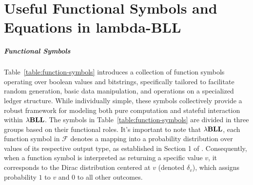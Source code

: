 \renewcommand{\chaptermark}[1]{\markright{\thechapter \ #1}{}}
\lhead[\fancyplain{}{\bfseries\thepage}]{\fancyplain{}{\bfseries\rightmark}}
\appendix
\chapter{Useful Functional Symbols and Equations in lambda-BLL}\label{app:1}
\paragraph{Functional Symbols}
Table~\ref{table:function-symbols} introduces a collection of function symbols operating over boolean values and bitstrings, specifically tailored to facilitate random generation, basic data manipulation, and operations on a specialized ledger structure. While individually simple, these symbols collectively provide a robust framework for modeling both pure computation and stateful interaction within ${\lambda}\mathbf{BLL}$. The symbols in Table~\ref{table:function-symbols} are divided in three groups based on their functional roles. It's important to note that ${\lambda}\mathbf{BLL}$, each function symbol in $\mathcal{F}$ denotes a mapping into a probability distribution over values of its respective output type, as established in Section 1 of \cite{lago2024-extended}. Consequently, when a function symbol is interpreted as returning a specific value $v$, it corresponds to the Dirac distribution centered at $v$ (denoted $\delta_v$), which assigns probability $1$ to $v$ and $0$ to all other outcomes.


